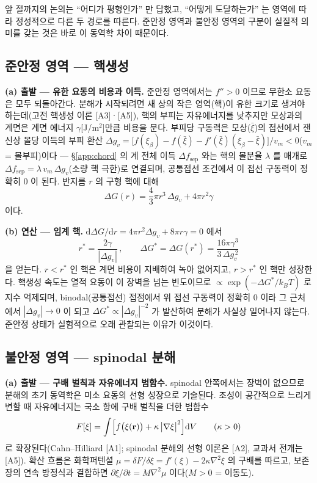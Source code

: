 \documentclass[11pt,a4paper]{article}
\newcommand{\dd}{\mathrm{d}}
\begin{document}
앞 절까지의 논의는 ``어디가 평형인가'' 만 답했고, ``어떻게 도달하는가'' 는 영역에 따라 정성적으로
다른 두 경로를 따른다. 준안정 영역과 불안정 영역의 구분이 실질적 의미를 갖는 것은 바로 이 동역학
차이 때문이다.

\subsection{준안정 영역 --- 핵생성}\label{app:nucleation}

\textbf{(a) 출발 --- 유한 요동의 비용과 이득.} 준안정 영역에서는 $f''>0$ 이므로 무한소 요동은 모두
되돌아간다. 분해가 시작되려면 새 상의 작은 영역(핵)이 유한 크기로 생겨야 하는데(고전 핵생성 이론 [A3]·[A5]), 핵의
부피는 자유에너지를 낮추지만 모상과의 계면은 계면 에너지 $\gamma$[J/m$^2$]만큼 비용을 문다. 부피당
구동력은 모상($\bar\xi$)의 접선에서 잰 신상 몰당 이득의 부피 환산
$\Delta g_v=\bigl[f(\xi_\beta)-f(\bar\xi)-f'(\bar\xi)(\xi_\beta-\bar\xi)\bigr]/v_m<0$($v_m$ = 몰부피)이다
--- \S\ref{app:chord} 의 계 전체 이득 $\Delta f_\mathrm{sep}$ 와는 핵의 몰분율 $\lambda$ 를 매개로
$\Delta f_\mathrm{sep}=\lambda\,v_m\,\Delta g_v$(소량 핵 극한)로 연결되며, 공통접선 조건에서 이 접선
구동력이 정확히 $0$ 이 된다. 반지름 $r$ 의 구형 핵에 대해
\begin{equation}
\Delta G(r)=\frac{4}{3}\pi r^3\,\Delta g_v+4\pi r^2\gamma
\label{eq:app-cnt}
\end{equation}
이다.

\textbf{(b) 연산 --- 임계 핵.} $\dd\Delta G/\dd r=4\pi r^2\Delta g_v+8\pi r\gamma=0$ 에서
\begin{equation}
r^\ast=\frac{2\gamma}{|\Delta g_v|}\,,\qquad
\Delta G^\ast=\Delta G(r^\ast)=\frac{16\pi\gamma^3}{3\,\Delta g_v^{\,2}}
\label{eq:app-rstar}
\end{equation}
을 얻는다. $r<r^\ast$ 인 핵은 계면 비용이 지배하여 녹아 없어지고, $r>r^\ast$ 인 핵만 성장한다. 핵생성
속도는 열적 요동이 이 장벽을 넘는 빈도이므로 $\propto\exp(-\Delta G^\ast/k_BT)$ 로 지수 억제되며,
binodal(공통접선) 접점에서 위 접선 구동력이 정확히 $0$ 이라 그 근처에서
$|\Delta g_v|\to0$ 이 되고 $\Delta G^\ast\propto|\Delta g_v|^{-2}$ 가 발산하여
분해가 사실상 일어나지 않는다. 준안정 상태가 실험적으로 오래 관찰되는 이유가 이것이다.

\subsection{불안정 영역 --- spinodal 분해}\label{app:spindecomp}

\textbf{(a) 출발 --- 구배 벌칙과 자유에너지 범함수.} spinodal 안쪽에서는 장벽이 없으므로 분해의
초기 동역학은 미소 요동의 선형 성장으로 기술된다. 조성이 공간적으로 느리게 변할 때 자유에너지는
국소 항에 구배 벌칙을 더한 범함수
\begin{equation}
F[\xi]=\int\Bigl[f\bigl(\xi(\mathbf{r})\bigr)+\kappa\,\bigl|\nabla\xi\bigr|^2\Bigr]\dd V
\qquad(\kappa>0)
\label{eq:app-ch-F}
\end{equation}
로 확장된다(Cahn--Hilliard [A1]; spinodal 분해의 선형 이론은 [A2], 교과서 전개는 [A5]).
확산 흐름은 화학퍼텐셜 $\mu=\delta F/\delta\xi=f'(\xi)-2\kappa\nabla^2\xi$
의 구배를 따르고, 보존장의 연속 방정식과 결합하면 $\partial\xi/\partial t=M\nabla^2\mu$ 이다($M>0$ =
이동도).
\end{document}
